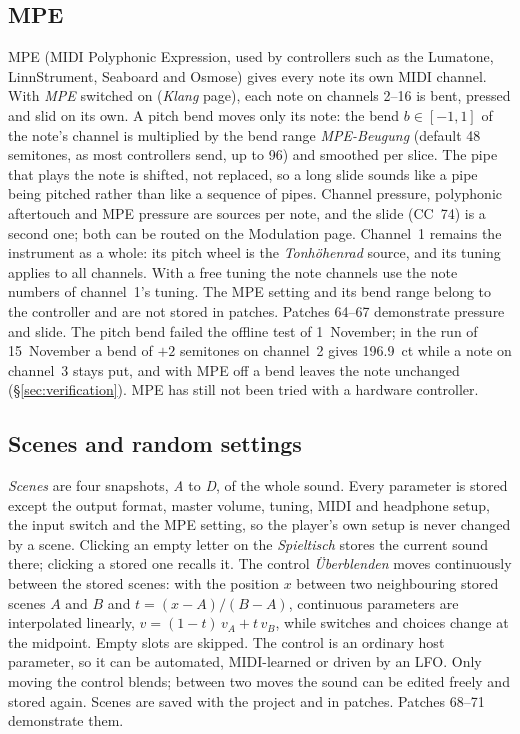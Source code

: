\documentclass[11pt,a4paper,parskip=half,DIV=11,toc=bibliography]{scrartcl}
\newcommand{\ui}[1]{\emph{#1}}                 %
\begin{document}
\subsection{MPE}
\label{sec:mpe}
MPE (MIDI Polyphonic Expression, used by controllers such as the Lumatone, LinnStrument, Seaboard and
Osmose) gives every note its own MIDI channel. With \ui{MPE} switched on (\ui{Klang} page), each note on
channels 2--16 is bent, pressed and slid on its own. A pitch bend moves only its note: the bend
$b\in[-1,1]$ of the note's channel is multiplied by the bend range \ui{MPE-Beugung} (default 48 semitones, as
most controllers send, up to 96) and smoothed per slice. The pipe that plays the note is shifted, not replaced,
so a long slide sounds like a pipe being pitched rather than like a sequence of pipes. Channel pressure,
polyphonic aftertouch and MPE pressure are sources per note, and the slide (CC~74) is a second one; both can
be routed on the Modulation page. Channel~1 remains the instrument as a whole: its pitch wheel is the
\ui{Tonhöhenrad} source, and its tuning applies to all channels. With a free tuning the note channels use the
note numbers of channel~1's tuning. The MPE setting and its bend range belong to the controller and are not
stored in patches. Patches 64--67 demonstrate pressure and slide. The pitch bend failed the offline test of 1~November; in the run of
15~November a bend of $+2$ semitones on channel~2 gives \SI{196.9}{ct} while a note on channel~3 stays put, and with MPE off a bend leaves the note
unchanged (\S\ref{sec:verification}). MPE has still not been tried with a hardware controller.

\subsection{Scenes and random settings}
\label{sec:scenes}
\emph{Scenes} are four snapshots, \ui{A} to \ui{D}, of the whole sound. Every parameter is stored except the
output format, master volume, tuning, MIDI and headphone setup, the input switch and the MPE setting, so the
player's own setup is never changed by a scene. Clicking an empty letter on the \ui{Spieltisch} stores the
current sound there; clicking a stored one recalls it. The control \ui{Überblenden} moves continuously
between the stored scenes: with the position $x$ between two neighbouring stored scenes $A$ and $B$ and
$t=(x-A)/(B-A)$, continuous parameters are interpolated linearly, $v=(1-t)\,v_A+t\,v_B$, while switches and
choices change at the midpoint. Empty slots are skipped. The control is an ordinary host parameter, so it can
be automated, MIDI-learned or driven by an LFO. Only moving the control blends; between two moves the sound
can be edited freely and stored again. Scenes are saved with the project and in patches. Patches 68--71
demonstrate them.
\end{document}
